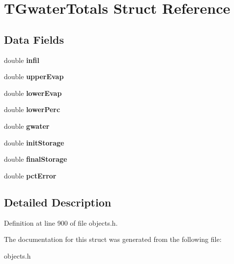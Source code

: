 \hypertarget{struct_t_gwater_totals}{}\section{T\+Gwater\+Totals Struct Reference}
\label{struct_t_gwater_totals}
\subsection*{Data Fields}
\begin{DoxyCompactItemize}
\item 
\mbox{\label{struct_t_gwater_totals_a870be47f33955d02d624bc9de06adad0}} 
double {\bfseries infil}
\item 
\mbox{\label{struct_t_gwater_totals_a204f31291d547b5b910cfd15a0ef09b9}} 
double {\bfseries upper\+Evap}
\item 
\mbox{\label{struct_t_gwater_totals_a0f8e59867dd9ebf3b1c3ae52047db505}} 
double {\bfseries lower\+Evap}
\item 
\mbox{\label{struct_t_gwater_totals_a6e32d03c458dcba29fdc191c9b438a50}} 
double {\bfseries lower\+Perc}
\item 
\mbox{\label{struct_t_gwater_totals_acd51fad32c8bd3bfc157a8e10c2c5b16}} 
double {\bfseries gwater}
\item 
\mbox{\label{struct_t_gwater_totals_a9d790bfe173117a2e0a66dda16221337}} 
double {\bfseries init\+Storage}
\item 
\mbox{\label{struct_t_gwater_totals_abe8e4d2ea662bd74d1fb8a14ab0a02ca}} 
double {\bfseries final\+Storage}
\item 
\mbox{\label{struct_t_gwater_totals_a6fcd79c6a0e66f48c596ff03935b6675}} 
double {\bfseries pct\+Error}
\end{DoxyCompactItemize}


\subsection{Detailed Description}


Definition at line 900 of file objects.\+h.



The documentation for this struct was generated from the following file\+:\begin{DoxyCompactItemize}
\item 
objects.\+h\end{DoxyCompactItemize}

